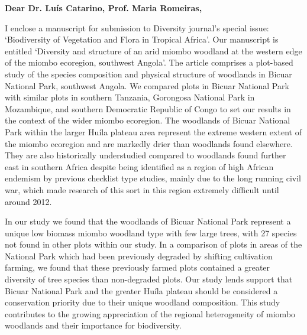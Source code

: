 \documentclass[a4paper]{letter}
\begin{document}



\begin{letter}{} %


	\opening{\textbf{Dear Dr. Lu\'{i}s Catarino, Prof. Maria Romeiras,}}
 
I enclose a manuscript for submission to Diversity journal's special issue: `Biodiversity of Vegetation and Flora in Tropical Africa'. Our manuscript is entitled `Diversity and structure of an arid miombo woodland at the western edge of the miombo ecoregion, southwest Angola'. The article comprises a plot-based study of the species composition and physical structure of woodlands in Bicuar National Park, southwest Angola. We compared plots in Bicuar National Park with similar plots in southern Tanzania, Gorongosa National Park in Mozambique, and southern Democratic Republic of Congo to set our results in the context of the wider miombo ecoregion. The woodlands of Bicuar National Park within the larger Hu\'{i}la plateau area represent the extreme western extent of the miombo ecoregion and are markedly drier than woodlands found elsewhere. They are also historically understudied compared to woodlands found further east in southern Africa despite being identified as a region of high African endemism by previous checklist type studies, mainly due to the long running civil war, which made research of this sort in this region extremely difficult until around 2012. 

In our study we found that the woodlands of Bicuar National Park represent a unique low biomass miombo woodland type with few large trees, with 27 species not found in other plots within our study. In a comparison of plots in areas of the National Park which had been previously degraded by shifting cultivation farming, we found that these previously farmed plots contained a greater diversity of tree species than non-degraded plots. Our study lends support that Bicuar National Park and the greater Hu\'{i}la plateau should be considered a conservation priority due to their unique woodland composition. This study contributes to the growing appreciation of the regional heterogeneity of miombo woodlands and their importance for biodiversity.


\end{letter}
\end{document}

